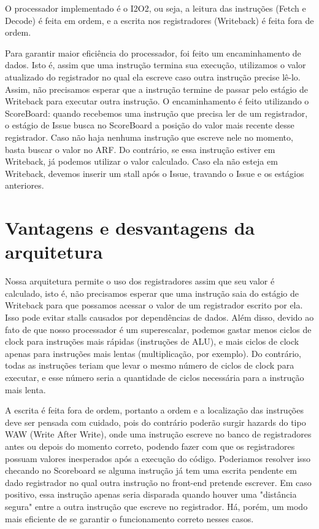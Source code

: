 \documentclass[12pt,a4paper]{article}
\numberwithin{equation}{section}
\begin{document}
O processador implementado é o I2O2, ou seja, a leitura das instruções (Fetch e Decode) é feita em ordem, e a escrita nos registradores (Writeback) é feita fora de ordem.

Para garantir maior eficiência do processador, foi feito um encaminhamento de dados. Isto é, assim que uma instrução termina sua execução, utilizamos o valor atualizado do registrador no qual ela escreve caso outra instrução precise lê-lo. Assim, não precisamos esperar que a instrução termine de passar pelo estágio de Writeback para executar outra instrução.
O encaminhamento é feito utilizando o ScoreBoard: quando recebemos uma instrução que precisa ler de um registrador, o estágio de Issue busca no ScoreBoard a posição do valor mais recente desse registrador. Caso não haja nenhuma instrução que escreve nele no momento, basta buscar o valor no ARF. Do contrário, se essa instrução estiver em Writeback, já podemos utilizar o valor calculado. Caso ela não esteja em Writeback, devemos inserir um stall após o Issue, travando o Issue e os estágios anteriores.

\section{Vantagens e desvantagens da arquitetura}

Nossa arquitetura permite o uso dos registradores assim que seu valor é calculado, isto é, não precisamos esperar que uma instrução saia do estágio de Writeback para que possamos acessar o valor de um registrador escrito por ela. Isso pode evitar stalls causados por dependências de dados. Além disso, devido ao fato de que nosso processador é um superescalar, podemos gastar menos ciclos de clock para instruções mais rápidas (instruções de ALU), e mais ciclos de clock apenas para instruções mais lentas (multiplicação, por exemplo). Do contrário, todas as instruções teriam que levar o mesmo número de ciclos de clock para executar, e esse número seria a quantidade de ciclos necessária para a instrução mais lenta.

A escrita é feita fora de ordem, portanto a ordem e a localização das instruções deve ser pensada com cuidado, pois do contrário poderão surgir hazards do tipo WAW (Write After Write), onde uma instrução escreve no banco de registradores antes ou depois do momento correto, podendo fazer com que os registradores possuam valores inesperados após a execução do código. Poderiamos resolver isso checando no Scoreboard se alguma instrução já tem uma escrita pendente em dado registrador no qual outra instrução no front-end pretende escrever. Em caso positivo, essa instrução apenas seria disparada quando houver uma "distância segura" entre a outra instrução que escreve no registrador. Há, porém, um modo mais eficiente de se garantir o funcionamento correto nesses casos.
\end{document}
